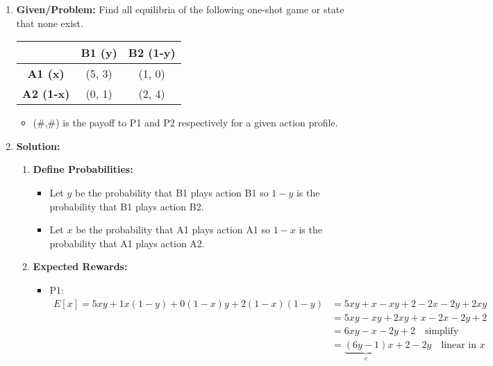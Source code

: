 \begin{example}
    \begin{enumerate}
        \item \textbf{Given/Problem:} Find all equilibria of the following one-shot game or state that none exist.
        \vspace{1em}
            \begin{center}
            \begin{tabular}{ccc}
            \toprule
            & \textbf{B1 (y)} & \textbf{B2 (1-y)} \\
            \midrule
            \textbf{A1 (x)} & (5, 3) & (1, 0) \\
            \textbf{A2 (1-x)} & (0, 1) & (2, 4) \\
            \bottomrule
            \end{tabular}
            \end{center}
        \vspace{1em}
        \begin{itemize}
            \item (\#,\#) is the payoff to P1 and P2 respectively for a given action profile.
        \end{itemize}
        \item \textbf{Solution:}
        \begin{enumerate}
            \item \textbf{Define Probabilities:}
            \begin{itemize}
                \item Let $y$ be the probability that B1 plays action B1 so $1-y$ is the probability that B1 plays action B2.
                \item Let $x$ be the probability that A1 plays action A1 so $1-x$ is the probability that A1 plays action A2.
            \end{itemize}
            \item \textbf{Expected Rewards:} 
            \begin{itemize}
                \item P1: 
                \begin{align*}
                    E[x] = 5xy + 1x(1-y) + 0(1-x)y + 2(1-x)(1-y) &= 5xy + x - xy + 2 - 2x - 2y + 2xy \\
                    &= 5xy - xy + 2xy + x - 2x - 2y + 2 \\
                    &= 6xy - x - 2y + 2 \quad \text{simplify} \\
                    &= \underbrace{(6y - 1)}_{c}x + 2 - 2y \quad \text{linear in $x$} 

\end{align*}
\end{itemize}
\end{enumerate}
\end{enumerate}
\end{example}
